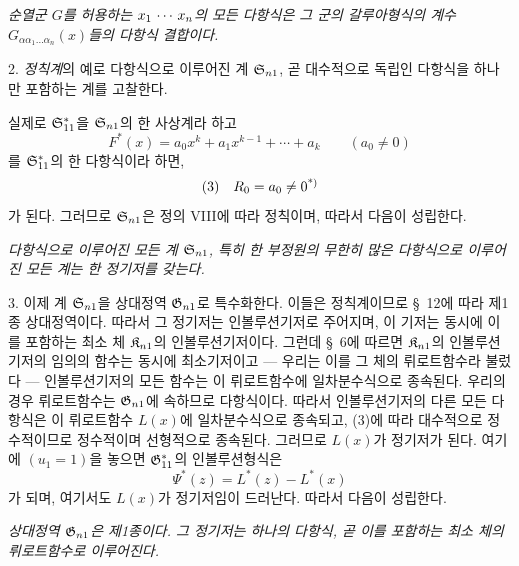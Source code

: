 \emph{순열군 $G$를 허용하는 $x_1\,\cdots\, x_n$의 모든 다항식은 그 군의 갈루아형식의 계수 $G_{\alpha\alpha_1\ldots\alpha_n}(x)$들의 다항식 결합이다.}

2. \emph{정칙계}의 예로 다항식으로 이루어진 계 $\mathfrak S_{n1}$, 곧 대수적으로 독립인 다항식을 하나만 포함하는 계를 고찰한다.

실제로 $\mathfrak S^*_{11}$을 $\mathfrak S_{n1}$의 한 사상계라 하고
\[
  F^*(x)=a_0x^k+a_1x^{k-1}+\cdots+a_k\qquad(a_0\ne0)
\]
를 $\mathfrak S^*_{11}$의 한 다항식이라 하면,
\[
\begin{array}{@{}l@{\quad}c@{}}
(3)& R_0=a_0\ne0\text{\srcfnmark{*)}}
\end{array}
\]
가 된다. 그러므로 $\mathfrak S_{n1}$은 정의 VIII에 따라 정칙이며, 따라서 다음이 성립한다.

\emph{다항식으로 이루어진 모든 계 $\mathfrak S_{n1}$, 특히 한 부정원의 무한히 많은 다항식으로 이루어진 모든 계는 한 정기저를 갖는다.}

3. 이제 계 $\mathfrak S_{n1}$을 상대정역 $\mathfrak G_{n1}$로 특수화한다. 이들은 정칙계이므로 \S\ 12에 따라 제1종 상대정역이다. 따라서 그 정기저는 인볼루션기저로 주어지며, 이 기저는 동시에 이를 포함하는 최소 체 $\mathfrak K_{n1}$의 인볼루션기저이다. 그런데 \S\ 6에 따르면 $\mathfrak K_{n1}$의 인볼루션기저의 임의의 함수는 동시에 최소기저이고 --- 우리는 이를 그 체의 뤼로트함수라 불렀다 --- 인볼루션기저의 모든 함수는 이 뤼로트함수에 일차분수식으로 종속된다. 우리의 경우 뤼로트함수는 $\mathfrak G_{n1}$에 속하므로 다항식이다. 따라서 인볼루션기저의 다른 모든 다항식은 이 뤼로트함수 $L(x)$에 일차분수식으로 종속되고, (3)에 따라 대수적으로 정수적이므로 정수적이며 선형적으로 종속된다. 그러므로 $L(x)$가 정기저가 된다. 여기에 $(u_1=1)$을 놓으면 $\mathfrak G^*_{11}$의 인볼루션형식은
\[
  \Psi^*(z)=L^*(z)-L^*(x)
\]
가 되며, 여기서도 $L(x)$가 정기저임이 드러난다. 따라서 다음이 성립한다.

\emph{상대정역 $\mathfrak G_{n1}$은 제1종이다. 그 정기저는 하나의 다항식, 곧 이를 포함하는 최소 체의 뤼로트함수로 이루어진다.}

